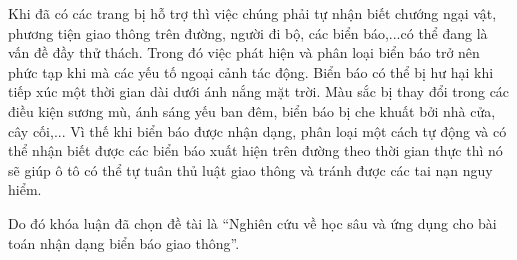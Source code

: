 Khi đã có các trang bị hỗ trợ thì việc chúng phải tự nhận biết chướng ngại vật, phương tiện giao thông trên đường, người đi bộ, các biển báo,...có thể đang là vấn đề đầy thử thách. Trong đó việc phát hiện và phân loại biển báo trở nên phức tạp khi mà các yếu tố ngoại cảnh tác động. Biển báo có thể bị hư hại khi tiếp xúc một thời gian dài dưới ánh nắng mặt trời. Màu sắc bị thay đổi trong các điều kiện sương mù, ánh sáng yếu ban đêm, biển báo bị che khuất bởi nhà cửa, cây cối,... Vì thế khi biển báo được nhận dạng, phân loại một cách tự động và có thể nhận biết được các biển báo xuất hiện trên đường theo thời gian thực thì nó sẽ giúp ô tô có thể tự tuân thủ luật giao thông và tránh được các tai nạn nguy hiểm.\par
Do đó khóa luận đã chọn đề tài là “Nghiên cứu về học sâu và ứng dụng cho bài toán nhận dạng biển báo giao thông”.
\begin{figure}[H]
\hspace{5mm}
\hfill
\end{figure}
